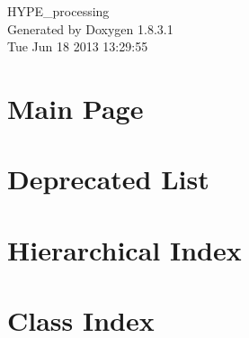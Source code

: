 \documentclass{book}
\begin{document}
\hypersetup{pageanchor=false,citecolor=blue}
\begin{titlepage}
\vspace*{7cm}
\begin{center}
{\Large H\-Y\-P\-E\-\_\-processing }\\
\vspace*{1cm}
{\large Generated by Doxygen 1.8.3.1}\\
\vspace*{0.5cm}
{\small Tue Jun 18 2013 13:29:55}\\
\end{center}
\end{titlepage}
\clearemptydoublepage
{}
\tableofcontents
\clearemptydoublepage
{}
\hypersetup{pageanchor=true,citecolor=blue}
\chapter{Main Page}
\label{index}\hypertarget{index}{}
\chapter{Deprecated List}
\label{deprecated}
\hypertarget{deprecated}{}

\chapter{Hierarchical Index}

\chapter{Class Index}

\end{document}
